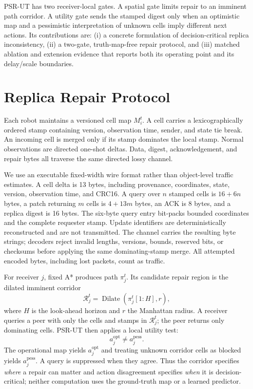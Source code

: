 \documentclass[conference]{IEEEtran}
\begin{document}
PSR-UT has two receiver-local gates. A spatial gate limits repair to an
imminent path corridor. A utility gate sends the stamped digest only when an
optimistic map and a pessimistic interpretation of unknown cells imply
different next actions. Its contributions are: (i) a concrete formulation of
decision-critical replica inconsistency, (ii) a two-gate, truth-map-free repair
protocol, and (iii) matched ablation and extension evidence that reports both
its operating point and its delay/scale boundaries.

\section{Replica Repair Protocol}
Each robot maintains a versioned cell map $M_i^t$. A cell carries a
lexicographically ordered stamp containing version, observation time, sender,
and state tie break. An incoming cell is merged only if its stamp dominates the
local stamp. Normal observations are directed one-shot deltas. Data, digest,
acknowledgement, and repair bytes all traverse the same directed lossy channel.

We use an executable fixed-width wire format rather than object-level traffic
estimates. A cell delta is 13 bytes, including provenance, coordinates, state,
version, observation time, and CRC16. A query over $n$ stamped cells is
$16+6n$ bytes, a patch returning $m$ cells is $4+13m$ bytes, an ACK is 8 bytes,
and a replica digest is 16 bytes. The six-byte query entry bit-packs bounded
coordinates and the complete requester stamp. Update identifiers are
deterministically reconstructed and are not transmitted. The channel carries
the resulting byte strings; decoders reject invalid lengths, versions, bounds,
reserved bits, or checksums before applying the same dominating-stamp merge.
All attempted encoded bytes, including lost packets, count as traffic.

For receiver $j$, fixed A* produces path $\pi_j^t$. Its candidate repair region
is the dilated imminent corridor
\begin{equation}
\mathcal{R}_j^t = \operatorname{Dilate}(\pi_j^t[1:H], r),
\end{equation}
where $H$ is the look-ahead horizon and $r$ the Manhattan radius. A receiver
queries a peer with only the cells and stamps in $\mathcal{R}_j^t$; the peer
returns only dominating cells. PSR-UT then applies a local utility test:
\begin{equation}
a_j^{\mathrm{opt}} \neq a_j^{\mathrm{pess}}.
\end{equation}
The operational map yields $a_j^{\mathrm{opt}}$ and treating unknown corridor
cells as blocked yields $a_j^{\mathrm{pess}}$. A query is suppressed when they
agree. Thus the corridor specifies \emph{where} a repair can matter and action
disagreement specifies \emph{when} it is decision-critical; neither computation
uses the ground-truth map or a learned predictor.
\end{document}
